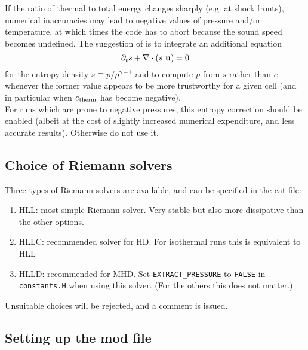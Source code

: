 If the ratio of thermal to total energy changes sharply (e.g. at shock
fronts), numerical inaccuracies may lead to negative values of pressure
and/or temperature, at which times the code has to abort because the sound
speed becomes undefined. The suggestion of \cite{L:Balsara_Spicer} is to
integrate an additional equation
\begin{equation}
  \partial_t s + \nabla \cdot \left( s \ {\bf u} \right) = 0
\end{equation}
for the entropy density $s \equiv p / \rho^{\gamma-1}$ and to compute $p$
from $s$ rather than $e$ whenever the former value appears to be more
trustworthy for a given cell (and in particular when $e_{\rm therm}$ has
become negative).\\
For runs which are prone to negative pressures, this entropy correction
should be enabled (albeit at the cost of slightly increased numerical
expenditure, and less accurate results). Otherwise do not use it.


\subsection{Choice of Riemann solvers}
\label{sect:riemann}
Three types of Riemann solvers are available, and can be specified in the
cat file:
\begin{enumerate}
\item HLL: most simple Riemann solver. Very stable but also more
  dissipative than the other options.
\item HLLC: recommended solver for HD. For isothermal runs this is
  equivalent to HLL
\item HLLD: recommended for MHD. Set {\tt EXTRACT\_PRESSURE} to {\tt FALSE}
  in {\tt constants.H} when using this solver. (For the others this does not
  matter.)
\end{enumerate}
Unsuitable choices will be rejected, and a comment is issued.

\subsection{Setting up the mod file}

